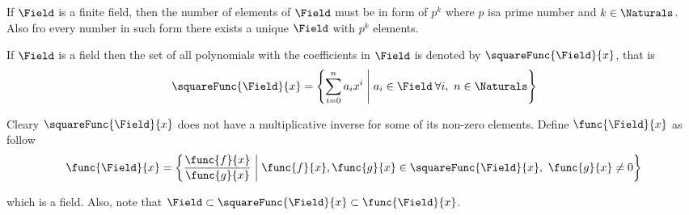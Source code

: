 \begin{theorem}
    If \(\Field\) is a finite field, then the number of elements of \(\Field\) must be in form of \(p^k\) where \(p\) isa prime number and \(k \in \Naturals\). Also fro every number in such form there exists a unique \(\Field\) with \(p^k\) elements.
\end{theorem}

If \(\Field\) is a field then the set of all polynomials with the coefficients in \(\Field\) is denoted by \(\squareFunc{\Field}{x}\), that is
\begin{equation*}
    \squareFunc{\Field}{x} = \left\{ \sum_{i = 0}^{n} a_i x^i \; \middle| \; a_i \in \Field \: \forall i,\ n \in \Naturals \right\}
\end{equation*}

Cleary \(\squareFunc{\Field}{x}\) does not have a multiplicative inverse for some of its non-zero elements. Define \(\func{\Field}{x}\) as follow
\begin{equation*}
    \func{\Field}{x} = \left\{ \frac{\func{f}{x}}{\func{g}{x}} \; \middle| \; \func{f}{x}, \func{g}{x} \in \squareFunc{\Field}{x}, \  \func{g}{x} \neq 0 \right\}
\end{equation*}

which is a field. Also, note that \(\Field \subset \squareFunc{\Field}{x} \subset \func{\Field}{x}\).